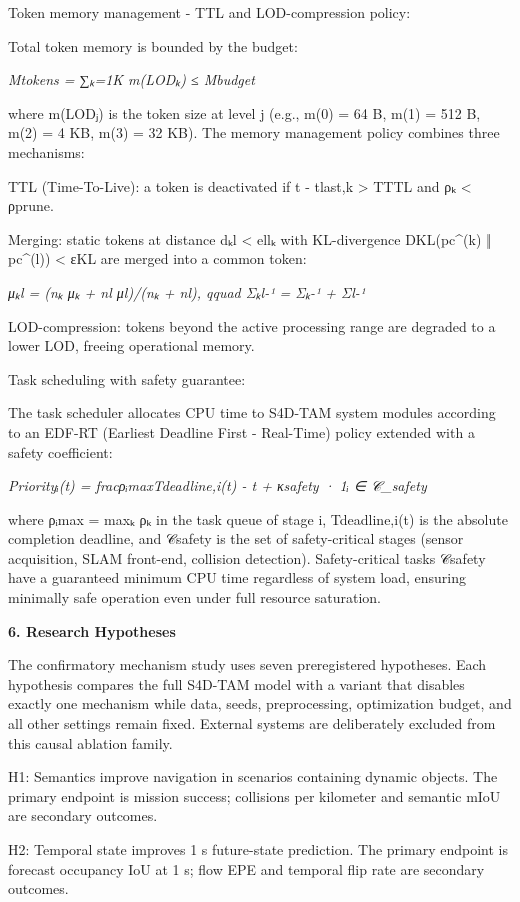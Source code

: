 \documentclass[
]{article}
\begin{document}
Token memory management - TTL and LOD-compression policy:

Total token memory is bounded by the budget:

\emph{Mtokens = ∑ₖ=1K m(LODₖ) ≤ Mbudget}

where m(LODⱼ) is the token size at level j (e.g., m(0) = 64 B, m(1) =
512 B, m(2) = 4 KB, m(3) = 32 KB). The memory management policy combines
three mechanisms:

TTL (Time-To-Live): a token is deactivated if t - tlast,k \textgreater{}
TTTL and ρₖ \textless{} ρprune.

Merging: static tokens at distance dₖl \textless{} ellₖ with
KL-divergence DKL(pc\^{}(k) ‖ pc\^{}(l)) \textless{} εKL are merged into
a common token:

\emph{μₖl = (nₖ μₖ + nl μl)/(nₖ + nl), qquad Σₖl-¹ = Σₖ-¹ + Σl-¹}

LOD-compression: tokens beyond the active processing range are degraded
to a lower LOD, freeing operational memory.

Task scheduling with safety guarantee:

The task scheduler allocates CPU time to S4D-TAM system modules
according to an EDF-RT (Earliest Deadline First - Real-Time) policy
extended with a safety coefficient:

\emph{Priorityᵢ(t) = fracρᵢmaxTdeadline,i(t) - t + κsafety · 1ᵢ ∈
𝒞\_safety}

where ρᵢmax = maxₖ ρₖ in the task queue of stage i, Tdeadline,i(t) is
the absolute completion deadline, and 𝒞safety is the set of
safety-critical stages (sensor acquisition, SLAM front-end, collision
detection). Safety-critical tasks 𝒞safety have a guaranteed minimum CPU
time regardless of system load, ensuring minimally safe operation even
under full resource saturation.

\textbf{6. Research Hypotheses}

The confirmatory mechanism study uses seven preregistered hypotheses.
Each hypothesis compares the full S4D-TAM model with a variant that
disables exactly one mechanism while data, seeds, preprocessing,
optimization budget, and all other settings remain fixed. External
systems are deliberately excluded from this causal ablation family.

H1: Semantics improve navigation in scenarios containing dynamic
objects. The primary endpoint is mission success; collisions per
kilometer and semantic mIoU are secondary outcomes.

H2: Temporal state improves 1 s future-state prediction. The primary
endpoint is forecast occupancy IoU at 1 s; flow EPE and temporal flip
rate are secondary outcomes.
\end{document}
